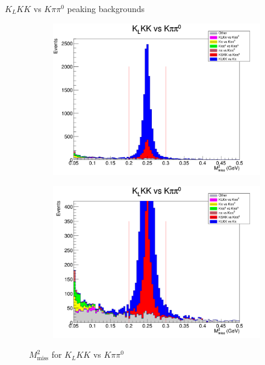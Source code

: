 \documentclass{beamer}
\begin{document}
\begin{frame}{$K_LKK$ vs $K\pi\pi^0$ peaking backgrounds}
  \begin{figure}
    \centering
    \begin{subfigure}{0.5\textwidth}
      \centering
      \includegraphics[width=\textwidth]{KLKKVersusKpipi0Peaking.png}
    \end{subfigure}%
    \begin{subfigure}{0.5\textwidth}
      \centering
      \includegraphics[width=\textwidth]{KLKKVersusKpipi0Peaking2.png}
    \end{subfigure}
    \caption{$M^2_\text{miss}$ for $K_LKK$ vs $K\pi\pi^0$}
  \end{figure}
\end{frame}
\end{document}
